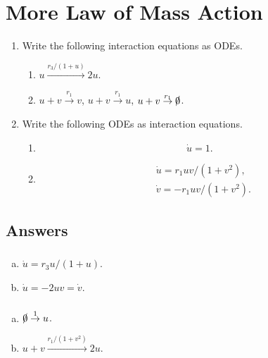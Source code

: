 \documentclass[]{article}
\newcommand{\bb}{\begin{equation}}
\newcommand{\ee}{\end{equation}}
\begin{document}
\section{More Law of Mass Action}
\begin{enumerate}
\item Write the following interaction equations as ODEs.
\begin{enumerate}
\item $u\stackrel{r_3/(1+u)}{\rightarrow}2u$.
\item $u+v\stackrel{r_1}{\rightarrow}v$, $u+v\stackrel{r_1}{\rightarrow}u$, $u+v\stackrel{r_1}{\rightarrow}\slashed{0}$.
\end{enumerate}

\item Write the following ODEs as interaction equations.
\begin{enumerate}
\item 
\bb
\dot{u}=1\nonumber.
\ee
\item 
\begin{align}
&\dot{u}=r_1uv/(1+v^2),\nonumber\\
&\dot{v}=-r_1uv/(1+v^2).\nonumber
\end{align}
\end{enumerate}
\end{enumerate}
\begin{Answ}
\subsection{Answers}
\subsubsection{}
\begin{enumerate}[(a)]
\item $\dot{u}=r_3u/(1+u)$.
\item $\dot{u}=-2uv=\dot{v}$.
\end{enumerate}
\subsubsection{}
\begin{enumerate}[(a)]
\item $\slashed{0}\stackrel{1}{\rightarrow}u$.
\item $u+v\stackrel{r_1/(1+v^2)}{\rightarrow}2u$.
\end{enumerate}
\end{Answ}
\end{document}
